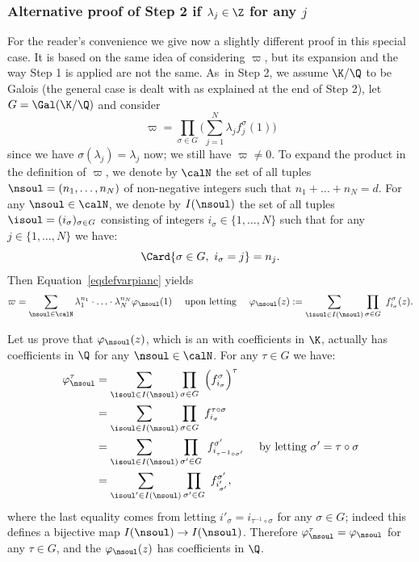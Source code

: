 \subsubsection*{Alternative proof of Step 2 if $\lambda_j\in\Z$ for any $j$}
For the reader's convenience we give now a slightly different proof in this special case. It is based on the same idea of considering $\varpi$, but its expansion and the way Step 1 is applied are not the same. As~in Step 2, we assume $\K/\Q$ to be Galois (the general case is dealt with as explained at the end of Step 2), let $G=\Gal(\K/\Q)$ and consider
\begin{equation} \label{eqdefvarpianc}
\varpi = \prod_{\sigma\in G} \Big( \sum_{j=1}^N \lambda_j f_j^\sigma(1)\Big)
\end{equation}
since we have $\sigma(\lambda_j)=\lambda_j$ now; we still have $\varpi\neq 0$. To expand the product in the definition of $\varpi$, we denote by $\calN$ the set of all tuples $\nsoul = (n_1,\ldots,n_N)$ of non-negative integers such that $ n_1 + \ldots + n_N = d$. For any $\nsoul\in\calN$, we denote by $I(\nsoul) $ the set of all tuples $\isoul = (i_\sigma)_{\sigma\in G}$ consisting of	 integers $i_\sigma\in\{1,\ldots,N\}$ such that for any $j\in\{1,\ldots,N\}$ we have:
\[
\Card \{ \sigma\in G, \, \, i_\sigma=j\}=n_j.
\]
Then Equation~\eqref{eqdefvarpianc} yields
\begin{equation} \label{eqvarpi2}
\varpi = \sum_{\nsoul \in \calN} \lambda_1^{n_1} \cdot \ldots \cdot \lambda_N^{n_N} \varphi_{\nsoul}(1) \quad \mbox{ upon letting }\quad
\varphi_{\nsoul}(z) := \sum_{ \isoul\in I(\nsoul)} \prod_{\sigma\in G} \ f_{i_\sigma}^\sigma(z) .
\end{equation}

Let us prove that $\varphi_{\nsoul}(z)$, which is an \Efunction with coefficients in $\K$, actually has coefficients in $\Q$ for any $\nsoul\in\calN$. For any $\tau\in G$ we have:
\begin{align*}
\varphi_{\nsoul} ^\tau
&= \sum_{ \isoul\in I(\nsoul)} \prod_{\sigma\in G} \ \Big( f_{i_\sigma}^\sigma \Big)^\tau \\
&= \sum_{ \isoul\in I(\nsoul)} \prod_{\sigma\in G} \ f_{i_\sigma}^{\tau\circ\sigma} \\
&= \sum_{ \isoul\in I(\nsoul)} \prod_{\sigma'\in G} \ f_{i_{\tau^{-1}\circ\sigma'}}^{ \sigma'} \quad \mbox{ by letting } \sigma'=\tau\circ\sigma\\
&= \sum_{ \isoul' \in I(\nsoul)} \prod_{\sigma'\in G} \ f_{i'_{ \sigma'}}^{ \sigma'},
\end{align*}
where the last equality comes from letting $ i'_\sigma = i_{\tau^{-1}\circ\sigma}$ for any $\sigma\in G$; indeed this defines a bijective map $I(\nsoul)\to I(\nsoul)$. Therefore $\varphi_{\nsoul} ^\tau = \varphi_{\nsoul}$ for any $\tau\in G$, and the \Efunction $\varphi_{\nsoul}(z)$ has coefficients in $\Q$.

